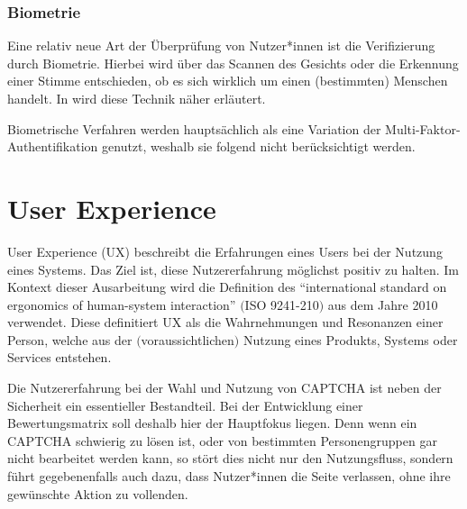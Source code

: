 \subsubsection*{Biometrie}
Eine relativ neue Art der Überprüfung von Nutzer*innen ist die Verifizierung durch Biometrie.
Hierbei wird über das Scannen des Gesichts oder die Erkennung einer Stimme entschieden, ob es sich wirklich um einen (bestimmten) Menschen handelt.
In \cite{rtcaptcha} wird diese Technik näher erläutert. 

Biometrische Verfahren werden hauptsächlich als eine Variation der Multi-Faktor-Authentifikation genutzt,
weshalb sie folgend nicht berücksichtigt werden. 

\section{User Experience}

User Experience (UX) beschreibt die Erfahrungen eines Users bei der Nutzung eines Systems. 
Das Ziel ist, diese Nutzererfahrung möglichst positiv zu halten. 
Im Kontext dieser Ausarbeitung wird die Definition des  ``international standard on ergonomics of human-system interaction'' $($ISO 9241-210$)$
aus dem Jahre 2010 verwendet. 
Diese definitiert UX als die Wahrnehmungen und Resonanzen einer Person, 
welche aus der $($voraussichtlichen$)$ Nutzung eines Produkts, Systems oder Services entstehen. \cite[p.1629]{berni_borgianni_2021}

Die Nutzererfahrung bei der Wahl und Nutzung von CAPTCHA ist neben der Sicherheit ein essentieller Bestandteil.
Bei der Entwicklung einer Bewertungsmatrix soll deshalb hier der Hauptfokus liegen.
Denn wenn ein CAPTCHA schwierig zu lösen ist, oder von bestimmten Personengruppen gar nicht bearbeitet werden kann, so stört dies nicht nur den Nutzungsfluss,
sondern führt gegebenenfalls auch dazu, dass Nutzer*innen die Seite verlassen, ohne ihre gewünschte Aktion zu vollenden. 

